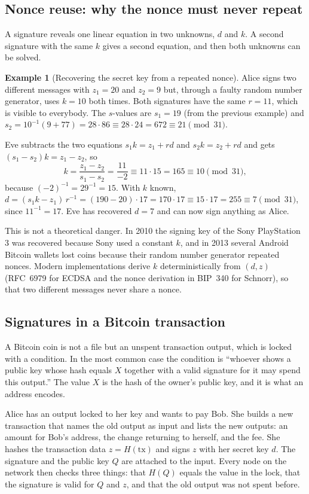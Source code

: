 \documentclass[11pt,a4paper]{article}
\theoremstyle{definition}
\newtheorem{example}[definition]{Example}
\newcommand{\Hash}{H}
\begin{document}
\subsection{Nonce reuse: why the nonce must never repeat}

A signature reveals one linear equation in two unknowns, $d$ and $k$. A second signature with the same $k$ gives a second equation, and then both unknowns can be solved.

\begin{example}[Recovering the secret key from a repeated nonce]\label{ex:nonce}
Alice signs two different messages with $z_1=20$ and $z_2=9$ but, through a faulty random number generator, uses $k=10$ both times. Both signatures have the same $r=11$, which is visible to everybody. The $s$-values are $s_1=19$ (from the previous example) and $s_2=10^{-1}(9+77)=28\cdot 86 \equiv 28\cdot 24=672\equiv 21 \pmod{31}$.

Eve subtracts the two equations $s_1k=z_1+rd$ and $s_2k=z_2+rd$ and gets $(s_1-s_2)k=z_1-z_2$, so
\[
k=\frac{z_1-z_2}{s_1-s_2}=\frac{11}{-2}\equiv 11\cdot 15=165\equiv 10 \pmod{31},
\]
because $(-2)^{-1}=29^{-1}=15$. With $k$ known, $d=(s_1k-z_1)\,r^{-1}=(190-20)\cdot 17=170\cdot 17\equiv 15\cdot 17=255\equiv 7 \pmod{31}$, since $11^{-1}=17$. Eve has recovered $d=7$ and can now sign anything as Alice.
\end{example}

This is not a theoretical danger. In 2010 the signing key of the Sony PlayStation 3 was recovered because Sony used a constant $k$, and in 2013 several Android Bitcoin wallets lost coins because their random number generator repeated nonces. Modern implementations derive $k$ deterministically from $(d,z)$ (RFC~6979 for ECDSA and the nonce derivation in BIP~340 for Schnorr), so that two different messages never share a nonce.

\subsection{Signatures in a Bitcoin transaction}

A Bitcoin coin is not a file but an unspent transaction output, which is locked with a condition. In the most common case the condition is ``whoever shows a public key whose hash equals $X$ together with a valid signature for it may spend this output.'' The value $X$ is the hash of the owner's public key, and it is what an address encodes.

Alice has an output locked to her key and wants to pay Bob. She builds a new transaction that names the old output as input and lists the new outputs: an amount for Bob's address, the change returning to herself, and the fee. She hashes the transaction data $z=\Hash(\text{tx})$ and signs $z$ with her secret key $d$. The signature and the public key $Q$ are attached to the input. Every node on the network then checks three things: that $\Hash(Q)$ equals the value in the lock, that the signature is valid for $Q$ and $z$, and that the old output was not spent before.
\end{document}
